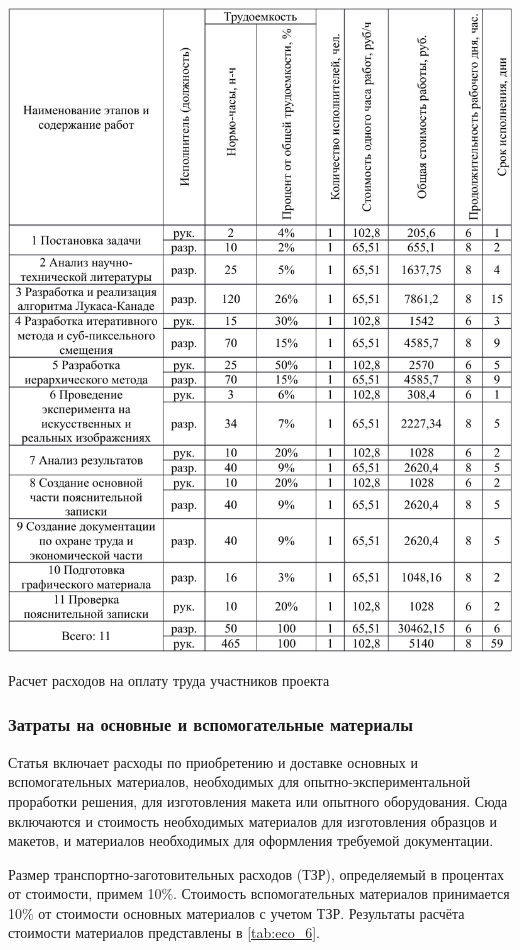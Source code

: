 \begin{table}[h!]
\centering
\includegraphics[page=5, width=0.9\linewidth]{econom_table.pdf}
\caption{Расчет расходов на оплату труда участников проекта}
\label{tab:eco_5}
\end{table}

\subsubsection{Затраты на основные и вспомогательные материалы}

Статья включает расходы по приобретению и доставке основных и вспомогательных материалов, необходимых для опытно-экспериментальной проработки решения, для изготовления макета или опытного оборудования. Сюда включаются и стоимость необходимых материалов для изготовления образцов и макетов, и материалов необходимых для оформления требуемой документации.

Размер транспортно-заготовительных расходов (ТЗР), определяемый в процентах от стоимости, примем 10\%. Стоимость вспомогательных материалов принимается 10\% от стоимости основных материалов с учетом ТЗР. Результаты расчёта стоимости материалов представлены в \ref{tab:eco_6}.

